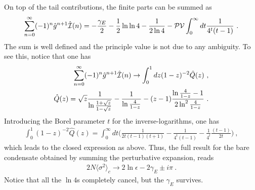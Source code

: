 \documentclass[a4paper,11pt]{article}
\begin{document}
On top of the tail contributions, the finite parts can be summed as
\begin{align}
\sum_{n=0}^{\infty}(-1)^n\hat g^{n+1}\hat{\cal I}(n)=-\frac{\gamma_E }{2}-\frac{1}{2} \ln \ln 4-\frac{1}{2 \ln 4}-{\cal PV}\int_0^{\infty} dt \frac{1}{4^t(t-1)} \ .
\end{align}
The sum is well defined and the principle value is not due to any ambiguity. To see this, notice that one has
\begin{align}
\sum_{n=0}^{\infty}(-1)^n\hat g^{n+1}\hat{\cal I}(n)\rightarrow \int_0^1 dz (1-z)^{-2} \hat Q(z) \ , \\
\hat Q(z)=\sqrt{z}\frac{1}{\ln \frac{1+\sqrt{z}}{1-\sqrt{z}}}-\frac{1}{\ln \frac{4}{1-z}}-(z-1)\frac{\ln\frac{4}{1-z}-1}{2\ln^2\frac{4}{1-z}} \ .
\end{align}
Introducing the Borel parameter $t$ for the inverse-logarithms, one has
\begin{align}
\int_0^1(1-z)^{-2}\hat Q(z)=\int_0^{\infty} dt \bigg(\frac{1}{2 t(t-1)(t+1)}-\frac{1}{4^t(t-1)}-\frac{1}{4^t}\frac{(t-1)}{2 t}\bigg) \ , 
\end{align}
which leads to the closed expression as above.
Thus, the full result for the bare condensate 
 obtained by summing the perturbative expansion, reads
\begin{align}
2N\langle \sigma^2\rangle_c \rightarrow 2\ln \epsilon-2\gamma_E \pm i\pi \ . 
\end{align}
Notice that all the $\ln 4$s completely cancel, but the $\gamma_E$ survives.  



 

\end{document}

